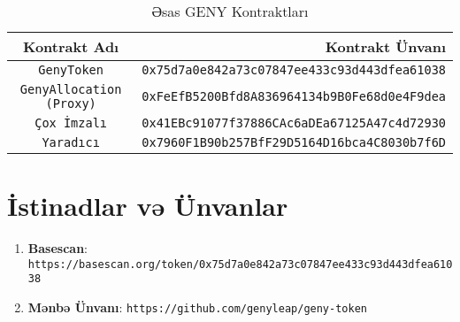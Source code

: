 \documentclass[a4paper,12pt,openany]{book}
\begin{document}
\begin{table}[h]
\centering
\caption*{Əsas GENY Kontraktları}
\small
\begin{tabular}{c r}
\hline
\textbf{Kontrakt Adı} & \textbf{Kontrakt Ünvanı} \\
\hline
\texttt{GenyToken} & {\texttt{0x75d7a0e842a73c07847ee433c93d443dfea61038}} \\
\texttt{GenyAllocation (Proxy)} & {\texttt{0xFeEfB5200Bfd8A836964134b9B0Fe68d0e4F9dea}} \\
\texttt{Çox İmzalı} & {\texttt{0x41EBc91077f37886CAc6aDEa67125A47c4d72930}} \\
\texttt{Yaradıcı} & {\texttt{0x7960F1B90b257BfF29D5164D16bca4C8030b7f6D}} \\
\hline
\end{tabular}
\end{table}

\section*{İstinadlar və Ünvanlar}

\begin{enumerate}
    \item \textbf{Basescan}: \texttt{https://basescan.org/token/0x75d7a0e842a73c07847ee433c93d443dfea61038}
    \item \textbf{Mənbə Ünvanı}: \texttt{https://github.com/genyleap/geny-token}
\end{enumerate}
\end{document}
